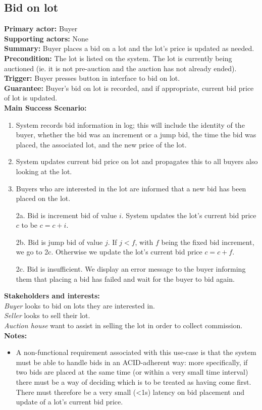 \documentclass[titlepage, 12pt]{extarticle}
\begin{document}
\subsection{Bid on lot}
{\bf Primary actor: } Buyer
\\{\bf Supporting actors: } None
\\{\bf Summary: } Buyer places a bid on a lot and the lot's price is updated as needed. 
\\{\bf Precondition: } The lot is listed on the system. The lot is currently being auctioned (ie. it is not pre-auction and the auction has not already ended).  
\\{\bf Trigger: } Buyer presses button in interface to bid on lot.
\\{\bf Guarantee: } Buyer's bid on lot is recorded, and if appropriate, current bid price of lot is updated. 
\\{\bf Main Success Scenario: } 
\begin{enumerate}
\item System records bid information in log; this will include the identity of the buyer, whether the bid was an increment or a jump bid, the time the bid was placed, the associated lot, and the new price of the lot. 
\item System updates current bid price on lot and propagates this to all buyers also looking at the lot. 
\item Buyers who are interested in the lot are informed that a new bid has been placed on the lot.
\end{enumerate}
\newpage
{}
\begin{itemize}
\item [2a.] Bid is increment bid of value $i$. System updates the lot's current bid price $c$ to be $c = c + i$.
\item [2b.] Bid is jump bid of value $j$. If $j < f$, with $f$ being the fixed bid increment, we go to 2c. Otherwise we update the lot's current bid price $c = c + f$.
\item [2c.] Bid is insufficient. We display an error message to the buyer informing them that placing a bid has failed and wait for the buyer to bid again. 
\end{itemize}
{\bf Stakeholders and interests: }
\\{\em Buyer} looks to bid on lots they are interested in.
\\{\em Seller} looks to sell their lot.
\\{\em Auction house} want to assist in selling the lot in order to collect commission.
\\{\bf Notes:}
\begin{itemize}
  \item A non-functional requirement associated with this use-case is that the system must be able to handle bids in an ACID-adherent way: more specifically, if two bids are placed at the same time (or within a very small time interval) there must be a way of deciding which is to be treated as having come first. There must therefore be a very small (<1s) latency on bid placement and update of a lot's current bid price. 
\end{itemize}
\end{document}
